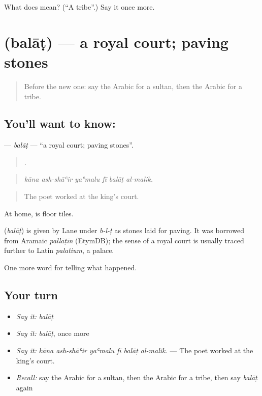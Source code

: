 \begin{tcolorbox}[breakable,colback=teal!4,colframe=teal!35!black,title={Before you move on}]
What does  mean? (\textquotedblleft{}A tribe\textquotedblright{}.) Say it once more.
\end{tcolorbox}
\section[\texorpdfstring{\ar{بلاط} (balāṭ)}{بلاط (balāṭ)}]{ (balāṭ) — a royal court; paving stones}

\label{lesson:AR-C340-balat}



\begin{quote}
Before the new one: say the Arabic for a sultan, then the Arabic for a tribe.
\end{quote}

\subsection*{You'll want to know: }
\textbf{} — \emph{balāṭ} — \textquotedblleft{}a royal court; paving stones\textquotedblright{}.

\begin{quote}
     .
\end{quote}

\begin{quote}
\emph{kāna ash-shāʿir yaʿmalu fī balāṭ al-malik.}
\end{quote}

\begin{quote}
The poet worked at the king’s court.
\end{quote}

At home,  is floor tiles.

\begin{cousinweb}
\textbf{} (\emph{balāṭ}) is given by Lane under \emph{b-l-ṭ} as stones laid for paving. It was borrowed from Aramaic \emph{pallāṭīn} (EtymDB); the sense of a royal court is usually traced further to Latin \emph{palatium}, a palace.
\end{cousinweb}

\begin{grammarlens}[title={What you've built}]
One more word for telling what happened.
\end{grammarlens}

\subsection*{Your turn}
\begin{itemize}
\raggedright
  \item \emph{Say it:} \emph{balāṭ}
  \item \emph{Say it:} \emph{balāṭ}, once more
  \item \emph{Say it:} \emph{kāna ash-shāʿir yaʿmalu fī balāṭ al-malik.} — The poet worked at the king’s court.
  \item \emph{Recall:} say the Arabic for a sultan, then the Arabic for a tribe, then say \emph{balāṭ} again
\end{itemize}

